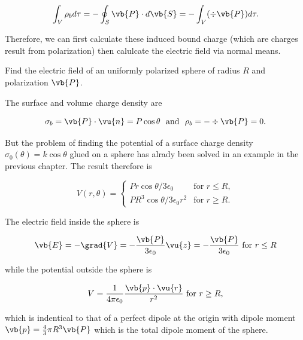 \documentclass[english,a4paper,12pt]{report}
\begin{document}
\begin{equation}
    \int_{V}^{} \rho _{b} d\tau = - \oint_{S} \vb{P} \cdot d\vb{S} = - \int_{V}^{} (\div{\vb{P} } )d\tau . 
\end{equation}

Therefore, we can first calculate these induced bound charge (which are charges result from polarization) then calulcate the electric field via normal means.

{Find the electric field of an uniformly polarized sphere of radius \(R\) and polarization \(\vb{P} \).}
{The surface and volume charge density are

\begin{equation}
    \sigma _{b} = \vb{P} \cdot \vu{n} = P\cos \theta  ~\text { and }~ \rho _{b} = - \div{\vb{P} } = 0.  
\end{equation}

But the problem of finding the potential of a surface charge density \(\sigma _{0} (\theta ) = k\cos \theta  \) glued on a sphere has alrady been solved in an example in the previous chapter. The result therefore is

\begin{equation}
 V(r, \theta) =
    \begin{cases}
    Pr \cos \theta / 3\epsilon _{0}  & \text{for } r \leq R, \\[10pt]
    PR^3 \cos \theta /3\epsilon _{0}r^2  & \text{for } r \geq R.
    \end{cases}  
\end{equation}

The electric field inside the sphere is 

\begin{equation}
    \vb{E} = -\grad{V} = - \frac{\vb{P} }{3\epsilon _{0} }\vu{z} = - \frac{\vb{P} }{3 \epsilon _{0} } \text{ for } r \le R
\end{equation}

while the potential outside the sphere is 

\begin{equation}
    V = \frac{1}{4\pi \epsilon_0} \frac{\vb{p} \cdot \vu{r} }{r^2} \text{ for } r \ge R, 
\end{equation}

which is indentical to that of a perfect dipole at the origin with dipole moment \(\vb{p} = \frac{4}{3}\pi R^3 \vb{P}  \) which is the total dipole moment of the sphere. 
} 
\end{document}

